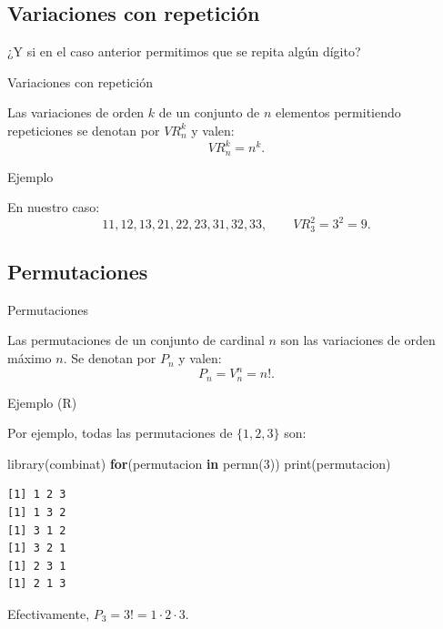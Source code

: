 \documentclass[
  letterpaper,
  DIV=11,
  numbers=noendperiod]{scrreprt}
\newenvironment{Shaded}{\begin{snugshade}}{\end{snugshade}}
\newcommand{\ControlFlowTok}[1]{\textcolor[rgb]{0.00,0.23,0.31}{\textbf{#1}}}
\newcommand{\DecValTok}[1]{\textcolor[rgb]{0.68,0.00,0.00}{#1}}
\newcommand{\FunctionTok}[1]{\textcolor[rgb]{0.28,0.35,0.67}{#1}}
\newcommand{\NormalTok}[1]{\textcolor[rgb]{0.00,0.23,0.31}{#1}}
\begin{document}
\subsection{Variaciones con
repetición}\label{variaciones-con-repeticiuxf3n}

¿Y si en el caso anterior permitimos que se repita algún dígito?

\begin{Definicion}{Variaciones con repetición}{}

Las variaciones de orden \(k\) de un conjunto de \(n\) elementos
permitiendo repeticiones se denotan por \(VR_n^k\) y valen: \[
VR_n^k=n^k.
\]

\end{Definicion}

\begin{Definicion}{Ejemplo}{}

En nuestro caso: \[
11,12,13,21,22,23,31,32,33,
\qquad
VR_3^2=3^2=9.
\]

\end{Definicion}

\subsection{Permutaciones}\label{permutaciones}

\begin{Definicion}{Permutaciones}{}

Las permutaciones de un conjunto de cardinal \(n\) son las variaciones
de orden máximo \(n\). Se denotan por \(P_n\) y valen: \[
P_n=V_n^n=n!.
\]

\end{Definicion}

\begin{Ejemplo}{Ejemplo (R)}{}

Por ejemplo, todas las permutaciones de \(\{1,2,3\}\) son:

\begin{Shaded}
\begin{Highlighting}[]
\FunctionTok{library}\NormalTok{(combinat)}
\ControlFlowTok{for}\NormalTok{(permutacion }\ControlFlowTok{in} \FunctionTok{permn}\NormalTok{(}\DecValTok{3}\NormalTok{)) }\FunctionTok{print}\NormalTok{(permutacion)}
\end{Highlighting}
\end{Shaded}

\begin{verbatim}
[1] 1 2 3
[1] 1 3 2
[1] 3 1 2
[1] 3 2 1
[1] 2 3 1
[1] 2 1 3
\end{verbatim}

Efectivamente, \(P_3=3!=1\cdot 2\cdot 3\).

\end{Ejemplo}
\end{document}

